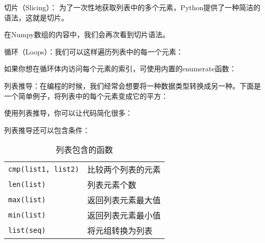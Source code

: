 
切片（Slicing）：
为了一次性地获取列表中的多个元素，Python提供了一种简洁的语法，这就是切片。




在Numpy数组的内容中，我们会再次看到切片语法。



循环（Loops）：我们可以这样遍历列表中的每一个元素：




如果你想在循环体内访问每个元素的索引，可使用内置的enumerate函数：





列表推导：在编程的时候，我们经常会想要将一种数据类型转换成另一种。下面是一个简单例子，将列表中的每个元素变成它的平方：





使用列表推导，你可以让代码简化很多：




列表推导还可以包含条件：





\begin{table}[htbp]
  \centering
  \caption{列表包含的函数}
  \begin{tabular}{l|l}\hline
    \lstinline|cmp(list1, list2)| &比较两个列表的元素\\
    \lstinline|len(list)        | &列表元素个数\\
    \lstinline|max(list)        | &返回列表元素最大值\\
    \lstinline|min(list)        | &返回列表元素最小值\\
    \lstinline|list(seq)        | &将元组转换为列表\\\hline
  \end{tabular}
\end{table}

